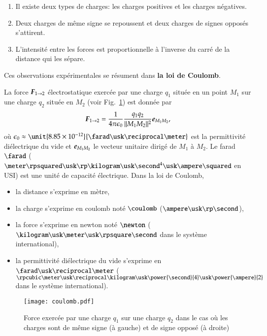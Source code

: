 \begin{enumerate}
	\item Il existe deux types de charges: les charges positives et les
	  charges négatives.
	\item Deux charges de même signe se repoussent et deux charges de signes
	  opposés s'attirent.
	\item L'intensité entre les forces est proportionnelle à l'inverse 
	  du carré de la distance qui les sépare.
\end{enumerate}
Ces observations expérimentales se résument dans \textbf{la loi de Coulomb}. 


\begin{defn}
	La force $\vecf_{1 \rightarrow 2}$ électrostatique
	exercée par une charge $q_1$ située en un point $M_1$ sur une 
	charge $q_2$ située en $M_2$ (voir Fig.~\ref{fig:coulomb}) est donnée par
	\begin{equation}
		\label{eq:loi_coulomb}
		\vecf_{1 \rightarrow 2} = \dfrac{1}{4\pi\epsilon_0}
	                                \dfrac{q_1 q_2}{||M_1M_2||^2}
					\mitbf{e}_{M_1M_2},
	\end{equation}
	où $\epsilon_0 \approx \unit{8.85 \times 10^{-12}}
	{\farad \usk \reciprocal \meter}$ 
	est la permittivité diélectrique
	du vide et $\mitbf{e}_{M_1M_2}$ le vecteur unitaire dirigé de $M_1$ à
	$M_2$. Le farad $\farad$ ($\meter \rpsquared \usk \rp \kilogram
	\usk \second^4 \usk \ampere \squared$ en USI)
	est une unité de capacité électrique.
	Dans la loi de Coulomb,
	\begin{itemize}
		\item la distance s'exprime en mètre,
		\item la charge s'exprime en coulomb noté $\coulomb$
		($\ampere \usk \rp \second$),
		\item la force s'exprime en newton noté $\newton$ 
		  ($\kilogram \usk \meter
		  \usk \rpsquare \second$ dans le système international),
		\item la permittivité diélectrique du vide s'exprime en 
		  $\farad \usk \reciprocal \meter$ 
		  ($\rpcubic \meter \usk \reciprocal \kilogram \usk 
		  \power{\second}{4} \usk \power{\ampere}{2}$ dans le système
		  international).
	\end{itemize}

\end{defn}

\begin{figure}[h!]
	\centering
	\texttt{[image: coulomb.pdf]}
	\caption{Force exercée par une charge $q_1$ sur une charge $q_2$ dans
	         le cas où les charges sont de même signe (à gauche) et de 
	 	signe opposé (à droite)}%
	\label{fig:coulomb}
\end{figure}



